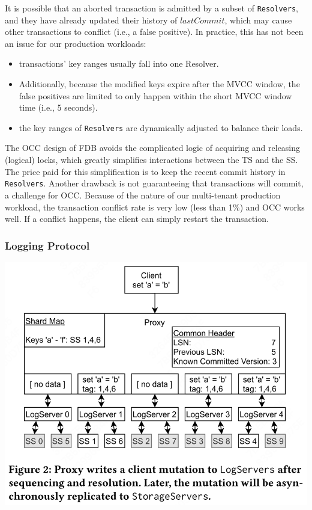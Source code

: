 \documentclass[11pt]{article}
\begin{document}
It is possible that an aborted transaction is admitted by a subset of \texttt{Resolvers}, and they have already
updated their history of \(lastCommit\), which may cause other transactions to conflict (i.e., a false positive).
In practice, this has not been an issue for our production workloads:
\begin{itemize}
\item transactions’ key ranges usually fall into one Resolver.
\item Additionally, because the modified keys expire after the MVCC window, the false positives are
limited to only happen within the short MVCC window time (i.e., 5 seconds).
\item the key ranges of \texttt{Resolvers} are dynamically adjusted to balance their loads.
\end{itemize}

The OCC design of FDB avoids the complicated logic of acquiring and releasing (logical) locks, which
greatly simplifies interactions between the TS and the SS. The price paid for this simplification is
to keep the recent commit history in \texttt{Resolvers}. Another drawback is not guaranteeing that transactions
will commit, a challenge for OCC. Because of the nature of our multi-tenant production workload, the
transaction conflict rate is very low (less than 1\%) and OCC works well. If a conflict happens, the
client can simply restart the transaction.
\subsubsection{Logging Protocol}
\label{sec:org59305ec}
\begin{center}
\includegraphics[width=.7\textwidth]{../../images/papers/110.png}
\label{f2}
\end{center}
\end{document}
